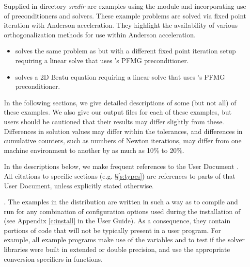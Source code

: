 \vspace{0.2in}\noindent
Supplied in directory {\em srcdir}
are examples using the {\nvecp} module and incorporating use
of {\hypre} preconditioners and solvers.
These example problems are solved via fixed point iteration with
Anderson acceleration. They highlight the availability
of various orthogonalization methods for use within
Anderson acceleration.
\begin{itemize}
\item {}
  solves the same problem as 
  but with a different fixed point iteration setup requiring
  a linear solve that uses {\hypre}'s PFMG preconditioner.
\item {}
  solves a 2D Bratu equation \cite{Frank-Kam:55} requiring a linear solve
  that uses {\hypre}'s PFMG preconditioner.
\end{itemize}


\vspace{0.2in}\noindent
In the following sections, we give detailed descriptions of some (but
not all) of these examples.  We also give our output files for
each of these examples, but users should be cautioned that their
results may differ slightly from these.  Differences in solution
values may differ within the tolerances, and differences in cumulative
counters, such as numbers of Newton iterations, may differ
from one machine environment to another by as much as 10\% to 20\%.

In the descriptions below, we make frequent references to the {\kinsol}
User Document \cite{kinsol_ug}.  All citations to specific sections
(e.g. \S\ref{s:types}) are references to parts of that User Document, unless
explicitly stated otherwise.

\vspace{0.2in}.
The examples in the {\kinsol} distribution are written in such a way as
to compile and run for any combination of configuration options used during
the installation of {\sundials} (see Appendix \ref{c:install} in the User Guide).
As a consequence, they contain portions of code that will not be typically present in a
user program. For example, all {\CC} example programs make use of the
variables  and 
to test if the solver libraries were built in extended or double precision,
and use the appropriate conversion specifiers in  functions.

